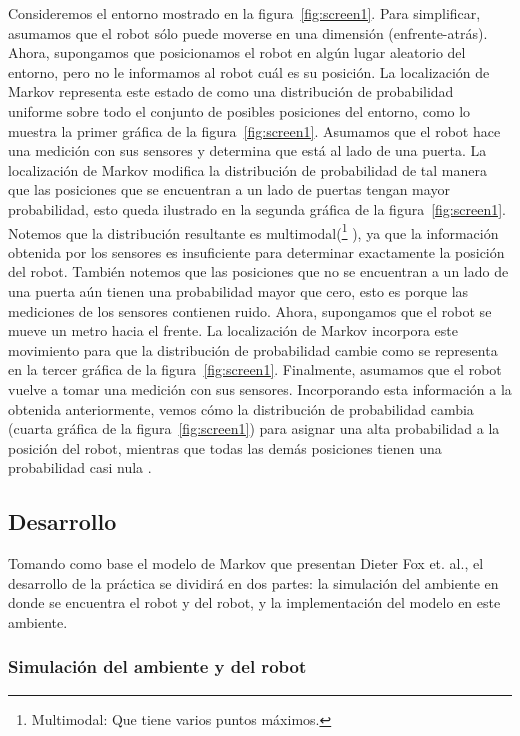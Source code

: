 Consideremos el entorno mostrado en la figura~\ref{fig:screen1}. Para simplificar, asumamos que el robot sólo puede moverse en una dimensión (enfrente-atrás). Ahora, supongamos que posicionamos el robot en algún lugar aleatorio del entorno, pero no le informamos al robot cuál es su posición. La localización de Markov representa este estado de  como una distribución de probabilidad uniforme sobre todo el conjunto de posibles posiciones del entorno, como lo muestra la primer gráfica de la figura~\ref{fig:screen1}. Asumamos que el robot hace una medición con sus sensores y determina que está al lado de una puerta. La localización de Markov modifica la distribución de probabilidad de tal manera que las posiciones que se encuentran a un lado de puertas tengan mayor probabilidad, esto queda ilustrado en la segunda gráfica de la figura~\ref{fig:screen1}. Notemos que la distribución resultante es multimodal(\footnote{Multimodal: Que tiene varios puntos máximos.} ), ya que la información obtenida por los sensores es insuficiente para determinar exactamente la posición del robot. También notemos que las posiciones que no se encuentran a un lado de una puerta aún tienen una probabilidad mayor que cero, esto es porque las mediciones de los sensores contienen ruido. Ahora, supongamos que el robot se mueve un metro hacia el frente. La localización de Markov incorpora este movimiento para que la distribución de probabilidad cambie como se representa en la tercer gráfica de la figura~\ref{fig:screen1}. Finalmente, asumamos que el robot vuelve a tomar una medición con sus sensores. Incorporando esta información a la obtenida anteriormente, vemos cómo la distribución de probabilidad cambia (cuarta gráfica de la figura~\ref{fig:screen1}) para asignar una alta probabilidad a la posición del robot, mientras que todas las demás posiciones tienen una probabilidad casi nula \parencite{Dieter1999}. 

\subsection{Desarrollo}

Tomando como base el modelo de Markov que presentan Dieter Fox et. al., el desarrollo de la práctica se dividirá en dos partes: la simulación del ambiente en donde se encuentra el robot y del robot, y la implementación del modelo en este ambiente.

\subsubsection{Simulación del ambiente y del robot}

